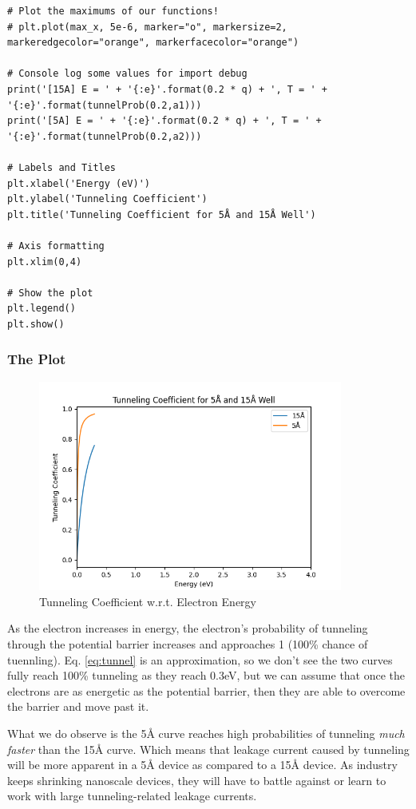 \documentclass{article}
\begin{document}
\begin{lstlisting}
# Plot the maximums of our functions!
# plt.plot(max_x, 5e-6, marker="o", markersize=2, markeredgecolor="orange", markerfacecolor="orange")

# Console log some values for import debug
print('[15A] E = ' + '{:e}'.format(0.2 * q) + ', T = ' + '{:e}'.format(tunnelProb(0.2,a1)))
print('[5A] E = ' + '{:e}'.format(0.2 * q) + ', T = ' + '{:e}'.format(tunnelProb(0.2,a2)))

# Labels and Titles
plt.xlabel('Energy (eV)')
plt.ylabel('Tunneling Coefficient')
plt.title('Tunneling Coefficient for 5Å and 15Å Well')

# Axis formatting
plt.xlim(0,4)

# Show the plot
plt.legend()
plt.show()
\end{lstlisting}

\clearpage

\subsubsection{The Plot}
\begin{figure}[!ht] 
    \centering
    \includegraphics[width = 10cm]{plot2.png}
    \caption{Tunneling Coefficient w.r.t. Electron Energy}
\end{figure}

As the electron increases in energy, the electron's probability of tunneling through the potential barrier increases and approaches 1 (100\% chance of tuennling). Eq. \ref{eq:tunnel} is an approximation, so we don't see the two curves fully reach 100\% tunneling as they reach 0.3eV, but we can assume that once the electrons are as energetic as the potential barrier, then they are able to overcome the barrier and move past it. 

\bigskip

What we do observe is the 5Å curve reaches high probabilities of tunneling \textit{much faster} than the 15Å curve. Which means that leakage current caused by tunneling will be more apparent in a 5Å device as compared to a 15Å device. As industry keeps shrinking nanoscale devices, they will have to battle against or learn to work with large tunneling-related leakage currents.
\end{document}

